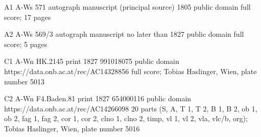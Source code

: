 \documentclass[tocdir=../../tmp/B1]{ees}
\begin{document}
\begin{sources}
  
\sourceitem%
  {A1}%
  {A-Ws}%
  {571}%
  {autograph manuscript (principal source)}%
  {1805}%
  {}%
  {public domain}%
  {}%
  {full score; 17 pages}


\sourceitem%
  {A2}%
  {A-Ws}%
  {569/3}%
  {autograph manuscript}%
  {no later than 1827}%
  {}%
  {public domain}%
  {}%
  {full score; 5 pages}


\sourceitem%
  {C1}%
  {A-Wn}%
  {HK.2145}%
  {print}%
  {1827}%
  {991018075}%
  {public domain}%
  {https://data.onb.ac.at/rec/AC14328856}%
  {full score; Tobias Haslinger, Wien, plate number 5013}


\sourceitem%
  {C2}%
  {A-Wn}%
  {F4.Baden.81}%
  {print}%
  {1827}%
  {654000116}%
  {public domain}%
  {https://data.onb.ac.at/rec/AC14266098}%
  {20 parts (S, A, T 1, T 2, B 1, B 2, ob 1, ob 2, fag 1, fag 2, cor 1, cor 2, clno 1, clno 2, timp, vl 1, vl 2, vla, vlc/b, org); Tobias Haslinger, Wien, plate number 5016}

\end{sources}
\end{document}
